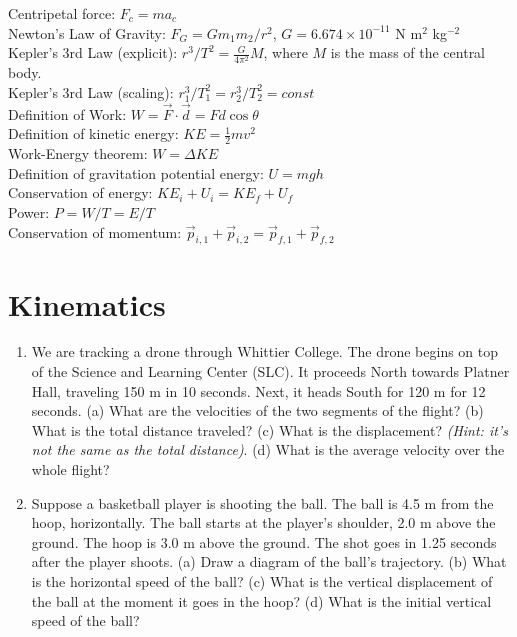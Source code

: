 \documentclass[10pt]{article}
\begin{document}
Centripetal force: $F_c = m a_c$ \\
Newton's Law of Gravity: $F_G = G m_1 m_2 / r^2$, $G = 6.674\times 10^{-11}$ N m$^2$ kg$^{-2}$ \\
Kepler's 3rd Law (explicit): $r^3/T^2 = \frac{G}{4\pi^2} M$, where $M$ is the mass of the central body. \\
Kepler's 3rd Law (scaling): $r_1^3/T_1^2 = r_2^3/T_2^2 = const$ \\
Definition of Work: $W = \vec{F} \cdot \vec{d} = Fd\cos\theta$ \\
Definition of kinetic energy: $KE = \frac{1}{2} mv^2$ \\
Work-Energy theorem: $W = \Delta KE$ \\
Definition of gravitation potential energy: $U = mgh$ \\
Conservation of energy: $KE_i + U_i = KE_f + U_f$ \\
Power: $P = W/T = E/T$ \\
Conservation of momentum: $\vec{p}_{i,1} + \vec{p}_{i,2} = \vec{p}_{f,1} + \vec{p}_{f,2}$ \\
\clearpage
\section{Kinematics}
\begin{enumerate}
\item We are tracking a drone through Whittier College.  The drone begins on top of the Science and Learning Center (SLC).  It proceeds North towards Platner Hall, traveling 150 m in 10 seconds.  Next, it heads South for 120 m for 12 seconds.  (a) What are the velocities of the two segments of the flight? (b) What is the total distance traveled? (c) What is the displacement? \textit{(Hint: it's not the same as the total distance)}. (d) What is the average velocity over the whole flight? \\ \vspace{2.5cm}
\item Suppose a basketball player is shooting the ball.  The ball is 4.5 m from the hoop, horizontally.  The ball starts at the player's shoulder, 2.0 m above the ground.  The hoop is 3.0 m above the ground.  The shot goes in 1.25 seconds after the player shoots.  (a) Draw a diagram of the ball's trajectory. (b) What is the horizontal speed of the ball? (c) What is the vertical displacement of the ball at the moment it goes in the hoop? (d) What is the initial vertical speed of the ball? \\ \vspace{2.5cm}
\end{enumerate}
\end{document}
